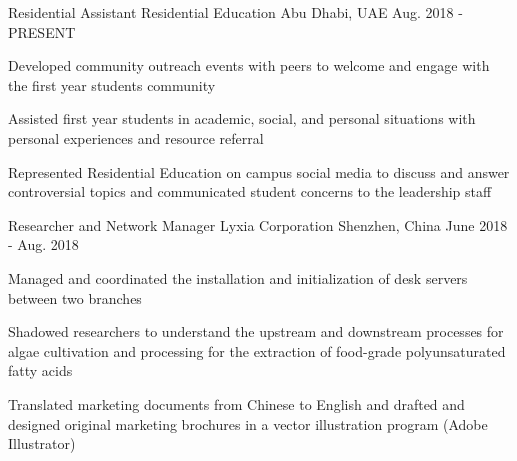 \begin{cventries}
  \cventry
    {Residential Assistant} %
    {Residential Education} %
    {Abu Dhabi, UAE} %
    {Aug. 2018 - PRESENT} %
    {
      \begin{cvitems} %
        \item {Developed community outreach events with peers to welcome and engage with the first year students community}
        \item {Assisted first year students in academic, social, and personal situations with personal experiences and resource referral}
        \item {Represented Residential Education on campus social media to discuss and answer controversial topics and communicated student concerns to the leadership staff}
      \end{cvitems}
    }

  \cventry
    {Researcher and Network Manager} %
    {Lyxia Corporation} %
    {Shenzhen, China} %
    {June 2018 - Aug. 2018} %
    {
      \begin{cvitems} %
        \item {Managed and coordinated the installation and initialization of desk servers between two branches}
        \item {Shadowed researchers to understand the upstream and downstream processes for algae cultivation and processing for the extraction of food-grade polyunsaturated fatty acids}
        \item {Translated marketing documents from Chinese to English and drafted and designed original marketing brochures in a vector illustration program (Adobe Illustrator)}
      \end{cvitems}
    }

 

\end{cventries}
